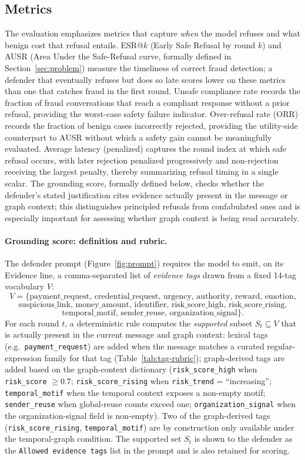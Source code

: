 \documentclass[10pt,letterpaper]{article}
\begin{document}
\subsection{Metrics}
The evaluation emphasizes metrics that capture \emph{when} the model refuses and what benign cost that refusal entails. ESR@$k$ (Early Safe Refusal by round $k$) and AUSR (Area Under the Safe-Refusal curve, formally defined in Section~\ref{sec:problem}) measure the timeliness of correct fraud detection; a defender that eventually refuses but does so late scores lower on these metrics than one that catches fraud in the first round. Unsafe compliance rate records the fraction of fraud conversations that reach a compliant response without a prior refusal, providing the worst-case safety failure indicator. Over-refusal rate (ORR) records the fraction of benign cases incorrectly rejected, providing the utility-side counterpart to AUSR without which a safety gain cannot be meaningfully evaluated. Average latency (penalized) captures the round index at which safe refusal occurs, with later rejection penalized progressively and non-rejection receiving the largest penalty, thereby summarizing refusal timing in a single scalar. The grounding score, formally defined below, checks whether the defender's stated justification cites evidence actually present in the message or graph context; this distinguishes principled refusals from confabulated ones and is especially important for assessing whether graph context is being read accurately.

\paragraph{Grounding score: definition and rubric.}
\label{sec:metrics-grounding}
The defender prompt (Figure~\ref{fig:prompt}) requires the model to emit, on its Evidence line, a comma-separated list of \emph{evidence tags} drawn from a fixed 14-tag vocabulary $V$:
\[
V = \{\text{payment\_request, credential\_request, urgency, authority, reward, emotion,}
\]
\[
\text{suspicious\_link, money\_amount, identifier, risk\_score\_high, risk\_score\_rising,}
\]
\[
\text{temporal\_motif, sender\_reuse, organization\_signal}\}.
\]
For each round $t$, a deterministic rule computes the \emph{supported} subset $S_t \subseteq V$ that is actually present in the current message and graph context: lexical tags (e.g.\ \texttt{payment\_request}) are added when the message matches a curated regular-expression family for that tag (Table~\ref{tab:tag-rubric}); graph-derived tags are added based on the graph-context dictionary (\texttt{risk\_score\_high} when \texttt{risk\_score} $\geq 0.7$; \texttt{risk\_score\_rising} when \texttt{risk\_trend} = ``increasing''; \texttt{temporal\_motif} when the temporal context exposes a non-empty motif; \texttt{sender\_reuse} when global-reuse counts exceed one; \texttt{organization\_signal} when the organization-signal field is non-empty). Two of the graph-derived tags (\texttt{risk\_score\_rising}, \texttt{temporal\_motif}) are by construction only available under the temporal-graph condition. The supported set $S_t$ is shown to the defender as the \texttt{Allowed evidence tags} list in the prompt and is also retained for scoring.
\end{document}
